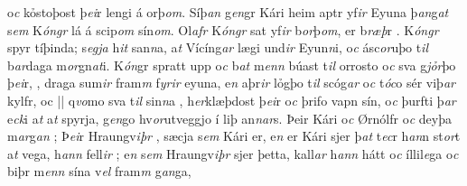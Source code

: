 o\textit{c} kỏstoþost þ\textit{ei}r lengi á orþ\textit{om}.
Síþ\textit{an} g\textit{en}gr Kári  heim aptr yf\textit{ir} Eyuna þ\textit{an}g\textit{at} s\textit{em} K\textit{óngr} lá á scip\textit{om}
sín\textit{om}. 
Ol\textit{afr} K\textit{óngr} sat yf\textit{ir} b\textit{or}þ\textit{om}, er   b\textit{ræþ}r  . 
K\textit{óngr} spyr tíþinda;    s\textit{egja} h\textit{it} san\textit{n}a, a\textit{t} Vícíng\textit{ar}
lægi und\textit{ir} Eyun\textit{n}i, o\textit{c} ásc\textit{or}uþo t\textit{il} b\textit{ar}daga   m\textit{or}gn\textit{at}i. 
K\textit{ón}gr spratt upp o\textit{c} b\textit{at} m\textit{enn} búast t\textit{il} orrosto o\textit{c} sva g\textit{jỏr}þo þ\textit{ei}r,  , draga sum\textit{ir} fram\textit{m} f\textit{yrir} eyuna, e\textit{n} aþr\textit{ir} lỏgþo t\textit{il}
scóg\textit{ar} o\textit{c} t\textit{óc}o sér viþ\textit{ar} kylfr, oc 
||
q\textit{vo}mo sva t\textit{il} sin\textit{n}a   , h\textit{er}klæþdost  þ\textit{ei}r o\textit{c} þrifo vapn
sín, o\textit{c} þurfti þ\textit{ar} e\textit{ck}i a\textit{t}  a\textit{t} spyrja,  g\textit{en}go   hv\textit{or}utveggjo í liþ an\textit{n}\textit{ar}s.  
Þeir Kári o\textit{c} Ørnólfr   o\textit{c} deyþa m\textit{ar}g\textit{an}  ; 
Þ\textit{ei}r Hraungv\textit{iþr} , sæcja   s\textit{em} Kári er, e\textit{n} er Kári sjer þ\textit{at} t\textit{ec}r h\textit{an}n  st\textit{or}t a\textit{t} vega,   h\textit{ann} fell\textit{ir} ; 
e\textit{n} s\textit{em} Hraungv\textit{iþr} sjer þetta, kall\textit{ar} h\textit{ann}  hátt o\textit{c} íllil\textit{e}ga o\textit{c} biþr m\textit{enn} sína v\textit{el} fram\textit{m} g\textit{an}ga, 
